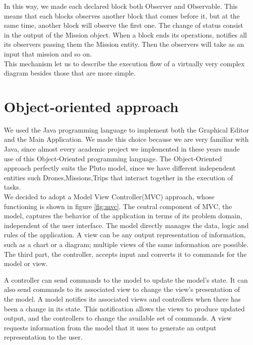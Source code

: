 In this way, we made each declared block both Observer and Observable. This means that each blocks observes another block that comes before it, but at the same time, another block will observe the first one. The change of status consist in the output of the Mission object. When a block ends its operations, notifies all its observers passing them the Mission entity. Then the observers will take as an input that mission and so on.
\\

This mechanism let us to describe the execution flow of a virtually very complex diagram besides those that are more simple.


\section{Object-oriented approach}\label{oomodel}

We used the Java programming language to implement both the Graphical Editor and the Main Application.
We made this choice because we are very familiar with Java, since almost every academic project we implemented in these years made use of this Object-Oriented programming language.
The Object-Oriented approach perfectly suits the Pluto model, since we have different independent entities such Drones,Missions,Trips that interact together in the execution of tasks.
\\

We decided to adopt a Model View Controller(MVC) approach, whose functioning is shown in figure \ref{fig:mvc}.
The central component of MVC, the model, captures the behavior of the application in terms of its problem domain, independent of the user interface.
The model directly manages the data, logic and rules of the application.
A view can be any output representation of information, such as a chart or a diagram; multiple views of the same information are possible.
The third part, the controller, accepts input and converts it to commands for the model or view.

A controller can send commands to the model to update the model's state.
It can also send commands to its associated view to change the view's presentation of the model.
A model notifies its associated views and controllers when there has been a change in its state. This notification allows the views to produce updated output, and the controllers to change the available set of commands.
A view requests information from the model that it uses to generate an output representation to the user.

